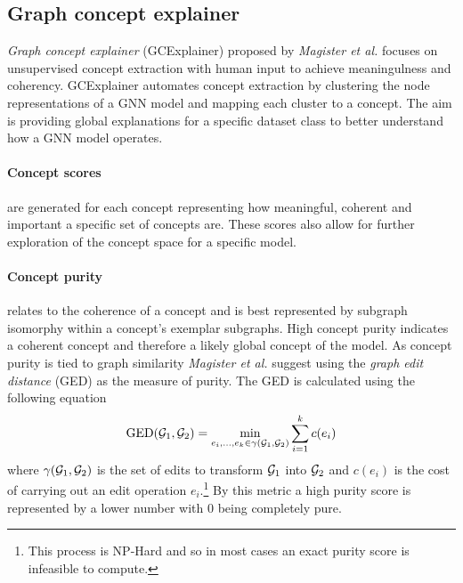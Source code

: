 

\subsection{Graph concept explainer}
\label{sec:GCE}



\emph{Graph concept explainer} (GCExplainer) proposed by \textit{Magister et al.}\cite{magister2021gcexplainer} focuses on unsupervised concept extraction with human input to achieve meaningulness and coherency.
GCExplainer automates concept extraction by clustering the node representations of a GNN model and mapping each cluster to a concept.
The aim is providing global explanations for a specific dataset class to better understand how a GNN model operates.



\paragraph{Concept scores} are generated for each concept representing how meaningful, coherent and important a specific set of concepts are.
These scores also allow for further exploration of the concept space for a specific model.

\paragraph{Concept purity}
relates to the coherence of a concept and is best represented by subgraph isomorphy within a concept's exemplar subgraphs.
High concept purity indicates a coherent concept and therefore a likely global concept of the model.
As concept purity is tied to graph similarity \textit{Magister et al.}\cite{magister2021gcexplainer} suggest using the \emph{graph edit distance} (GED) as the measure of purity.
The GED is calculated using the following equation
\begin{equation}
    \label{eq:GED}
    \operatorname{GED}({\mathcal{G}}_1, {\mathcal{G}}_2) = \underset{e_i,...,e_k \in \gamma({\mathcal{G}}_1, {\mathcal{G}}_2)}{\operatorname{min}} \sum_{i=1}^{k}c(e_i)
\end{equation}
where $\gamma({\mathcal{G}}_1, {\mathcal{G}}_2)$ is the set of edits to transform ${\mathcal{G}}_1$ into ${\mathcal{G}}_2$ and $c(e_i)$ is the cost of carrying out an edit operation $e_i$.\footnote{This process is NP-Hard and so in most cases an exact purity score is infeasible to compute.}
By this metric a high purity score is represented by a lower number with 0 being completely pure.

